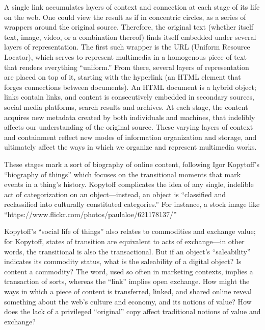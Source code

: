 A single link accumulates layers of context and connection at each stage of its life on the web. One could view the result as if in concentric circles, as a series of wrappers around the original source. \autocite{add figures here; one abstract concentric-circle view, one concrete view with a sample webpage} Therefore, the original text (whether itself text, image, video, or a combination thereof) finds itself embedded under several layers of representation. The first such wrapper is the URL (Uniform Resource Locator), which serves to represent multimedia in a homogenous piece of text that renders everything ``uniform.'' From there, several layers of representation are placed on top of it, starting with the hyperlink (an HTML element that forges connections between documents). An HTML document is a hybrid object; links contain links, and content is consecutively embedded in secondary sources, social media platforms, search results and archives. At each stage, the content acquires new metadata created by both individuals and machines, that indelibly affects our understanding of the original source. These varying layers of context and containment reflect new modes of information organization and storage, and ultimately affect the ways in which we organize and represent multimedia works.

These stages mark a sort of biography of online content, following Igor Kopytoff's ``biography of things'' which focuses on the transitional moments that mark events in a thing's history.  Kopytoff complicates the idea of any single, indelible act of categorization on an object---instead, an object is ``classified and reclassified into culturally constituted categories.''\autocite{kopytoff} For instance, a stock image like ``https://www.flickr.com/photos/paulaloe/621178137/''

Kopytoff's ``social life of things'' also relates to commodities and exchange value; for Kopytoff, states of transition are equivalent to acts of exchange---in other words, the transitional is also the transactional. But if an object's ``saleability'' indicates its commodity status, what is the saleability of a digital object? Is content a commodity? The word, used so often in marketing contexts, implies a transaction of sorts, whereas the ``link'' implies open exchange. How might the ways in which a piece of content is transferred, linked, and shared online reveal something about the web's culture and economy, and its notions of value? How does the lack of a privileged ``original'' copy affect traditional notions of value and exchange?

